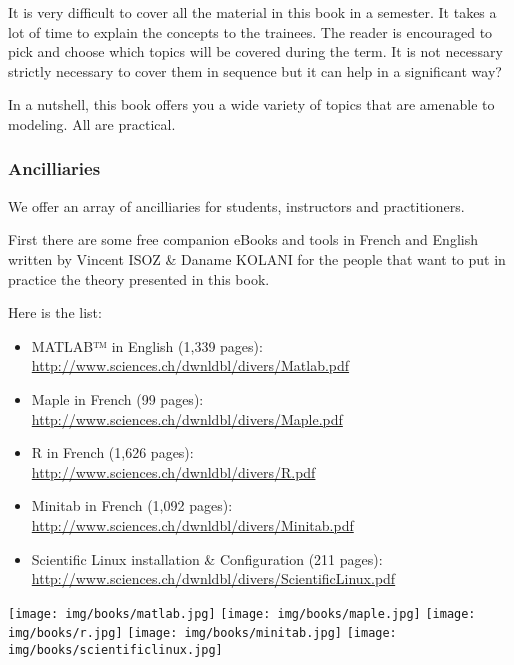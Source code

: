 	It is very difficult to cover all the material in this book in a semester. It takes a lot of time to explain the concepts to the trainees. The reader is encouraged to pick and choose which topics will be covered during the term. It is not necessary strictly necessary to cover them in sequence but it can help in a significant way?

	In a nutshell, this book offers you a wide variety of topics that are amenable to modeling. All are practical.
	
	\subsubsection{Ancilliaries}
	We offer an array of ancilliaries for students, instructors and practitioners.
	
	First there are some free companion eBooks and tools in French and English written by Vincent ISOZ \& Daname KOLANI for the people that want to put in practice the theory presented in this book.
	
	Here is the list:
	\begin{itemize}
		\item MATLAB™ in English (1,339 pages):\\ \href{http://www.sciences.ch/htmlfr/php/cliccount/click.php?id=319}{http://www.sciences.ch/dwnldbl/divers/Matlab.pdf}
		\item Maple in French (99 pages):\\ \href{http://www.sciences.ch/dwnldbl/divers/Maple.pdf}{http://www.sciences.ch/dwnldbl/divers/Maple.pdf}
		\item \textsf{R} in French (1,626 pages):\\ \href{http://www.sciences.ch/htmlfr/php/cliccount/click.php?id=313}{http://www.sciences.ch/dwnldbl/divers/R.pdf}
		\item Minitab in French (1,092 pages):\\ \href{http://www.sciences.ch/htmlfr/php/cliccount/click.php?id=282}{http://www.sciences.ch/dwnldbl/divers/Minitab.pdf}
		\item Scientific Linux installation \& Configuration  (211 pages):\\ \href{http://www.sciences.ch/dwnldbl/divers/ScientificLinux.pdf}{http://www.sciences.ch/dwnldbl/divers/ScientificLinux.pdf}
	\end{itemize}
	\begin{center}
		\texttt{[image: img/books/matlab.jpg]}
		\texttt{[image: img/books/maple.jpg]}
		\texttt{[image: img/books/r.jpg]}
		\texttt{[image: img/books/minitab.jpg]}
		\texttt{[image: img/books/scientificlinux.jpg]} 
	\end{center}	
		
